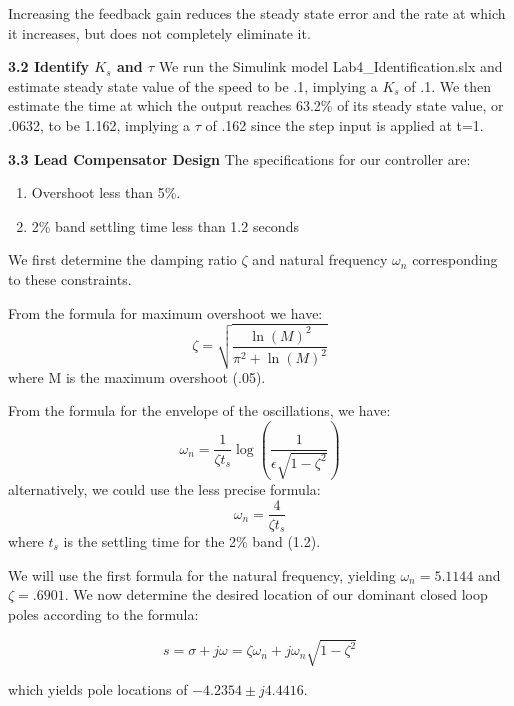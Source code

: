 \documentclass[11pt,a4paper]{article}
\begin{document}
\begin{enumerate}
Increasing the feedback gain reduces the steady state error and the rate at which it increases, but does not completely eliminate it.
	
\end{enumerate}

\textbf{3.2 Identify $K_{s}$ and $\tau$}
We run the Simulink model Lab4\_Identification.slx and estimate steady state value of the speed to be .1, implying a $K_{s}$ of .1. We then estimate the time at which the output reaches 63.2\% of its steady state value, or .0632, to be 1.162, implying a $\tau$ of .162 since the step input is applied at t=1.

\textbf{3.3 Lead Compensator Design}
The specifications for our controller are:
\begin{enumerate}
\item Overshoot less than 5\%.
\item 2\% band settling time less than 1.2 seconds
\end{enumerate}

We first determine the damping ratio $\zeta$ and natural frequency $\omega_{n}$ corresponding to these constraints.

From the formula for maximum overshoot we have:
\begin{equation}
	\zeta = \sqrt{\frac{\ln (M)^{2}}{\pi^{2} + \ln (M)^{2}}}
\end{equation}
where M is the maximum overshoot (.05).

From the formula for the envelope of the oscillations, we have:
\begin{equation}
	\omega_{n} = \frac{1}{\zeta t_{s}} \log \left( \frac{1}{\epsilon \sqrt{1 - \zeta^{2}}} \right)
\end{equation}
alternatively, we could use the less precise formula:
\begin{equation}
	\omega_{n} = \frac{4}{\zeta t_{s}}
\end{equation}
where $t_{s}$ is the settling time for the 2\% band (1.2).

We will use the first formula for the natural frequency, yielding $\omega_{n} = 5.1144$ and $\zeta = .6901$. We now determine the desired location of our dominant closed loop poles according to the formula: 

\begin{equation}
	s = \sigma + j \omega = \zeta \omega_{n} + j \omega_{n} \sqrt{1 - \zeta^{2}}
\end{equation}

which yields pole locations of $ -4.2354 \pm j 4.4416$. 
\end{document}
